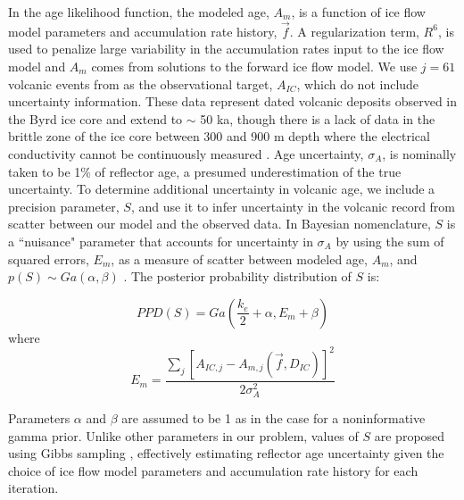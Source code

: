 In the age likelihood function, the modeled age, $A_m$, is a function of ice flow model parameters and accumulation rate history, $\vec{f}$. A regularization term, $R^6$, is used to penalize large variability in the accumulation rates input to the ice flow model and $A_m$ comes from solutions to the forward ice flow model. We use $j=61$ volcanic events from \citet{hammer1997} as the observational target, $A_{IC}$, which do not include uncertainty information. These data represent dated volcanic deposits observed in the Byrd ice core and extend to $\sim$ 50 ka, though there is a lack of data in the brittle zone of the ice core between 300 and 900 m depth where the electrical conductivity cannot be continuously measured \citep{hammer1997}. Age uncertainty, $\sigma_A$, is nominally taken to be 1\% of reflector age, a presumed underestimation of the true uncertainty. To determine additional uncertainty in volcanic age, we include a precision parameter, $S$, and use it to infer uncertainty in the volcanic record from scatter between our model and the observed data. In Bayesian nomenclature, $S$ is a ``nuisance" parameter that accounts for uncertainty in $\sigma_A$ by using the sum of squared errors, $E_m$, as a measure of scatter between modeled age, $A_m$, and $p(S) \sim Ga(\alpha,\beta)$ \citep{jackson&huerta2016}. The posterior probability distribution of $S$ is:

\begin{equation}\label{eqn:S}
PPD(S) = Ga(\frac{k_e}{2}+\alpha, E_m+\beta)
\end{equation}
where 
\begin{equation}
 E_m= \frac{\sum_{j}[A_{IC,j} - A_{m,j}(\vec{f},D_{IC})]^2}{2\sigma_A^2} 
\end{equation}

Parameters $\alpha$ and $\beta$ are assumed to be 1 as in the case for a noninformative gamma prior. Unlike other parameters in our problem, values of $S$ are proposed using Gibbs sampling \citep{gelfand1992}, effectively estimating reflector age uncertainty given the choice of ice flow model parameters and accumulation rate history for each iteration.





